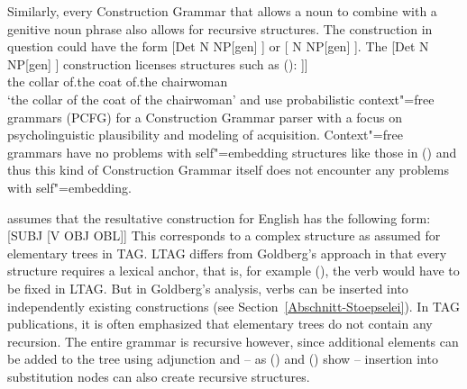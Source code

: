 Similarly, every Construction Grammar that allows a noun to combine with a genitive noun phrase also allows
for recursive structures. The construction in question could have the form [Det N
NP[gen] ] or [ N NP[gen] ]. The [Det N NP[gen] ] construction licenses structures such as ():
\ea
\gll [\sub{NP} des Kragens [\sub{NP} des Mantels [\sub{NP} der Vorsitzenden]]]\\
	{} the collar {} of.the coat {} of.the chairwoman\\
\glt `the collar of the coat of the chairwoman'
\z
\citet{Jurafsky96a} and \citet*{BLT2009a} use probabilistic context"=free grammars (PCFG) for a Construction Grammar parser
with a focus on psycholinguistic plausibility and modeling of acquisition. Context"=free grammars
have no problems with self"=embedding structures like those in () and thus this kind
of Construction Grammar itself does not encounter any problems with self"=embedding.

\citet[]{Goldberg95a} assumes that the resultative construction for English has the following
form:
\ea
{}[SUBJ [V OBJ OBL]] 
\z
This corresponds to a complex structure as assumed for elementary trees in TAG. LTAG differs from Goldberg's approach in that every structure requires a lexical
anchor, that is, for example (), the verb would have to be fixed in LTAG. But in Goldberg's analysis, verbs can be inserted into independently
existing constructions (see Section~\ref{Abschnitt-Stoepselei}). In TAG publications, it is often emphasized that elementary trees do not contain any recursion.
The entire grammar is recursive however, since additional elements can be added to the tree using adjunction and -- as () and
() show -- insertion into substitution nodes can also create recursive structures.



